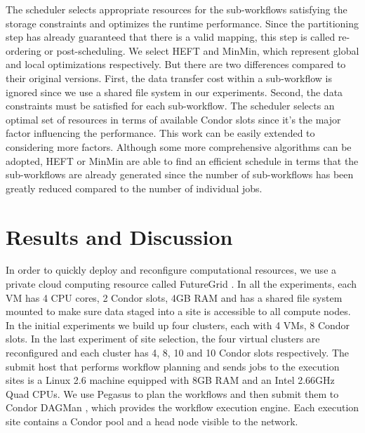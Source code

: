 The scheduler selects appropriate resources for the sub-workflows satisfying the storage constraints and optimizes the runtime performance. Since the partitioning step has already guaranteed that there is a valid mapping, this step is called re-ordering or post-scheduling. We select HEFT\cite{Topcuoglu2002} and MinMin\cite{Blythe2005}, which represent global and local optimizations respectively. But there are two differences compared to their original versions. First, the data transfer cost within a sub-workflow is ignored since we use a shared file system in our experiments. Second, the data constraints must be satisfied for each sub-workflow. 
The scheduler selects an optimal set of resources in terms of available Condor slots since it’s the major factor influencing the performance. This work can be easily extended to considering more factors. Although some more comprehensive algorithms can be adopted, HEFT or MinMin are able to find an efficient schedule in terms that the sub-workflows are already generated since the number of sub-workflows has been greatly reduced compared to the number of individual jobs.

\section{Results and Discussion}
In order to quickly deploy and reconfigure computational resources, we use a private cloud computing resource called FutureGrid \cite{Fox2013FutureGrid}. In all the experiments, each VM has 4 CPU cores, 2 Condor slots, 4GB RAM and has a shared file system mounted to make sure data staged into a site is accessible to all compute nodes. In the initial experiments we build up four clusters, each with 4 VMs, 8 Condor slots. In the last experiment of site selection, the four virtual clusters are reconfigured and each cluster has 4, 8, 10 and 10 Condor slots respectively. The submit host that performs workflow planning and sends jobs to the execution sites is a Linux 2.6 machine equipped with 8GB RAM and an Intel 2.66GHz Quad CPUs. We use Pegasus to plan the workflows and then submit them to Condor DAGMan \cite{DAGMan}, which provides the workflow execution engine. Each execution site contains a Condor pool and a head node visible to the network. 

